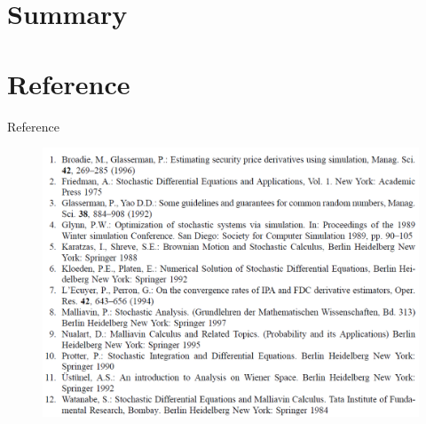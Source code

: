 \documentclass{beamer}
\begin{document}

\section{Summary}


\section{Reference}

\begin{frame}{Reference}
  \begin{figure}
  \centering
  \includegraphics[scale=0.3]{reference.png}\\
\end{figure}
\end{frame}
\end{document}
